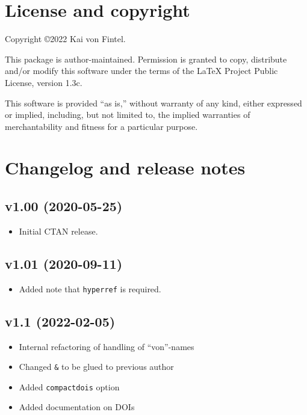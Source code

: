 \documentclass[
]{article}
\providecommand{\tightlist}{%
  \setlength{\itemsep}{0pt}\setlength{\parskip}{0pt}}
\begin{document}
\hypertarget{license-and-copyright}{%
\section{License and copyright}\label{license-and-copyright}}

Copyright ©2022 Kai von Fintel.

This package is author-maintained. Permission is granted to copy,
distribute and/or modify this software under the terms of the LaTeX
Project Public License, version 1.3c.

This software is provided ``as is,'' without warranty of any kind,
either expressed or implied, including, but not limited to, the implied
warranties of merchantability and fitness for a particular purpose.

\hypertarget{changelog-and-release-notes}{%
\section{Changelog and release
notes}\label{changelog-and-release-notes}}

\hypertarget{v1.00-2020-05-25}{%
\subsection*{v1.00 (2020-05-25)}\label{v1.00-2020-05-25}}

\begin{itemize}
\tightlist
\item
  Initial CTAN release.
\end{itemize}

\hypertarget{v1.01-2020-09-11}{%
\subsection*{v1.01 (2020-09-11)}\label{v1.01-2020-09-11}}

\begin{itemize}
\tightlist
\item
  Added note that \texttt{hyperref} is required.
\end{itemize}

\hypertarget{v1.1-2022-02-05}{%
\subsection*{v1.1 (2022-02-05)}\label{v1.1-2022-02-05}}

\begin{itemize}
\tightlist
\item
  Internal refactoring of handling of ``von''-names
\item
  Changed \texttt{\&} to be glued to previous author
\item
  Added \texttt{compactdois} option
\item
  Added documentation on DOIs
\end{itemize}
\end{document}
